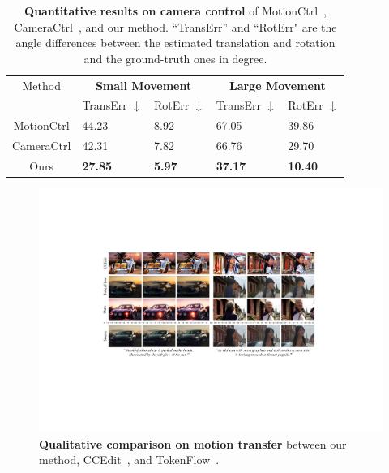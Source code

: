\begin{table}[]
\begin{tabular}{cllll}
\hline
Method     & \multicolumn{2}{c}{\textbf{Small Movement}} & \multicolumn{2}{c}{\textbf{Large Movement}} \\
           & TransErr $\downarrow$             & RotErr    $\downarrow$            & TransErr      $\downarrow$         & RotErr     $\downarrow$           \\ \hline
MotionCtrl & 44.23                  & 8.92                  & 67.05          & 39.86                  \\
CameraCtrl & 42.31                  & 7.82                  & 66.76                   & 29.70                 \\
Ours       & \textbf{27.85}         & \textbf{5.97}         & \textbf{37.17}                  & \textbf{10.40}         \\ \hline

\end{tabular}
\caption{\textbf{Quantitative results on camera control} of MotionCtrl~\cite{wang2024motionctrl}, CameraCtrl~\cite{he2024cameractrl}, and our method. ``TransErr'' and ``RotErr" are the angle differences between the estimated translation and rotation and the ground-truth ones in degree.}
\label{tab:camctrl}
\end{table}

\begin{figure}[htbp]
    \centering
    \includegraphics[width=\textwidth]{pictures/v2v2.pdf}
    \caption{\textbf{Qualitative comparison on motion transfer} between our method, CCEdit~\cite{ccedit}, and TokenFlow~\cite{tokenflow}.}
    \label{fig:v2v2}
\end{figure}

